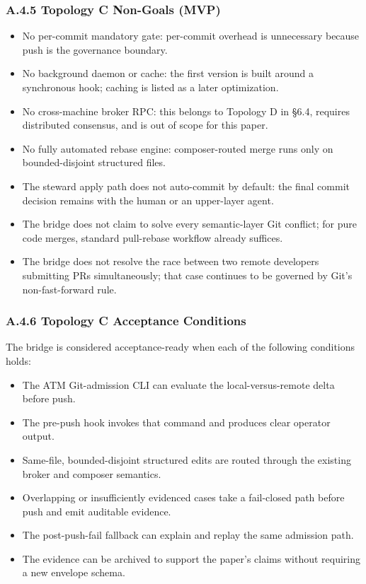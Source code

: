 \documentclass[9pt,letterpaper]{extarticle}
\begin{document}
\subsubsection*{A.4.5 Topology C Non-Goals (MVP)}

\begin{itemize}
\item No per-commit mandatory gate: per-commit overhead is unnecessary because push is the governance boundary.
\item No background daemon or cache: the first version is built around a synchronous hook; caching is listed as a later optimization.
\item No cross-machine broker RPC: this belongs to Topology D in §6.4, requires distributed consensus, and is out of scope for this paper.
\item No fully automated rebase engine: composer-routed merge runs only on bounded-disjoint structured files.
\item The steward apply path does not auto-commit by default: the final commit decision remains with the human or an upper-layer agent.
\item The bridge does not claim to solve every semantic-layer Git conflict; for pure code merges, standard pull-rebase workflow already suffices.
\item The bridge does not resolve the race between two remote developers submitting PRs simultaneously; that case continues to be governed by Git's non-fast-forward rule.
\end{itemize}

\subsubsection*{A.4.6 Topology C Acceptance Conditions}

The bridge is considered acceptance-ready when each of the following conditions holds:

\begin{itemize}
\item The ATM Git-admission CLI can evaluate the local-versus-remote delta before push.
\item The pre-push hook invokes that command and produces clear operator output.
\item Same-file, bounded-disjoint structured edits are routed through the existing broker and composer semantics.
\item Overlapping or insufficiently evidenced cases take a fail-closed path before push and emit auditable evidence.
\item The post-push-fail fallback can explain and replay the same admission path.
\item The evidence can be archived to support the paper's claims without requiring a new envelope schema.
\end{itemize}
\end{document}
